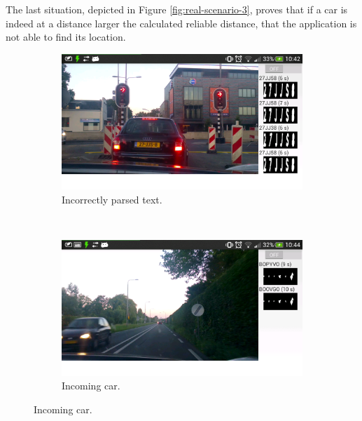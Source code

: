The last situation, depicted in Figure \ref{fig:real-scenario-3}, proves that if a car is indeed at a distance larger the calculated reliable distance, that the application is not able to find its location.

\begin{figure}[ht]
        \centering
        \begin{subfigure}{0.50\textwidth}
            \includegraphics[width=\textwidth]{plaatjes/real-scenario-1}
            \caption{Incorrectly parsed text.}
            \label{fig:real-scenario-1}
        \end{subfigure}%
        ~ 
        \begin{subfigure}{0.50\textwidth}
            \includegraphics[width=\textwidth]{plaatjes/real-scenario-2}
            \caption{Incoming car.}
            \label{fig:real-scenario-2}
        \end{subfigure}%


\end{figure}
